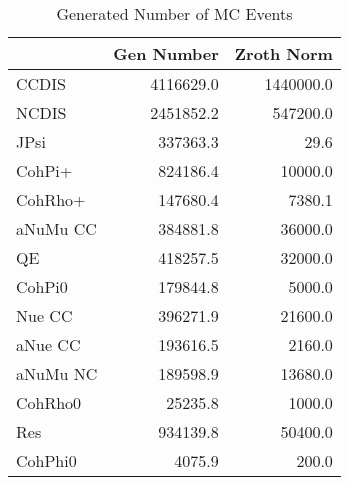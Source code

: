  \begin{table}[h!]\centering
 {\large{
 \begin{tabular}{||l|r|r||}
 \hline
 \hline
       & Gen Number   & Zroth Norm  \\
 \hline
 CCDIS     &  4116629.0 &  1440000.0 \\
 NCDIS     &  2451852.2 &   547200.0 \\
 JPsi      &   337363.3 &       29.6 \\
 CohPi+    &   824186.4 &    10000.0 \\
 CohRho+   &   147680.4 &     7380.1 \\
 aNuMu CC  &   384881.8 &    36000.0 \\
 QE        &   418257.5 &    32000.0 \\
 CohPi0    &   179844.8 &     5000.0 \\
  Nue CC   &   396271.9 &    21600.0 \\
 aNue CC   &   193616.5 &     2160.0 \\
 aNuMu NC  &   189598.9 &    13680.0 \\
 CohRho0   &    25235.8 &     1000.0 \\
 Res       &   934139.8 &    50400.0 \\
 CohPhi0   &     4075.9 &      200.0 \\
 \hline
 \hline
 \end{tabular}
 \caption{Generated Number of MC Events}
 \label{tab-gen-numbers}
 }}
 \end{table}
 \endinput
